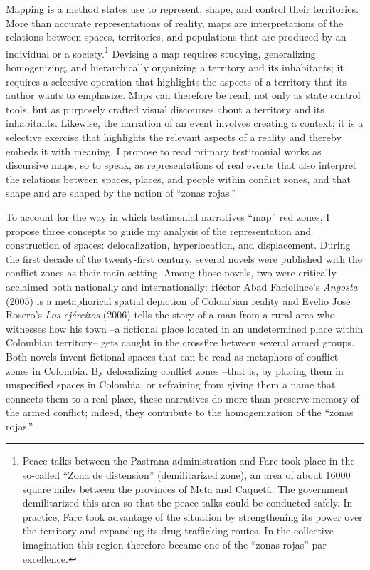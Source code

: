 \documentclass[
  11pt,
,
onecolumn,
openany
]{book}
\begin{document}
Mapping is a method states use to represent, shape, and control their
territories. More than accurate representations of reality, maps are
interpretations of the relations between spaces, territories, and populations
that are produced by an individual or a society.\footnote{Peace talks between
  the Pastrana administration and Farc took place in the so-called ``Zona de
  distension'' (demilitarized zone), an area of about 16000 square miles
  between the provinces of Meta and Caquetá. The government demilitarized this
  area so that the peace talks could be conducted safely. In practice, Farc
  took advantage of the situation by strengthening its power over the
  territory and expanding its drug trafficking routes. In the collective
  imagination this region therefore became one of the ``zonas rojas'' par
  excellence.} Devising a map requires studying, generalizing, homogenizing,
and hierarchically organizing a territory and its inhabitants; it requires a
selective operation that highlights the aspects of a territory that its author
wants to emphasize. Maps can therefore be read, not only as state control
tools, but as purposely crafted visual discourses about a territory and its
inhabitants. Likewise, the narration of an event involves creating a context;
it is a selective exercise that highlights the relevant aspects of a reality
and thereby embeds it with meaning. I propose to read primary testimonial
works as discursive maps, so to speak, as representations of real events that
also interpret the relations between spaces, places, and people within
conflict zones, and that shape and are shaped by the notion of ``zonas
rojas.''

To account for the way in which testimonial narratives ``map'' red zones, I
propose three concepts to guide my analysis of the representation and
construction of spaces: delocalization, hyperlocation, and displacement.
During the first decade of the twenty-first century, several novels were
published with the conflict zones as their main setting. Among those novels,
two were critically acclaimed both nationally and internationally: Héctor Abad
Faciolince's \emph{Angosta} (2005) is a metaphorical spatial depiction of
Colombian reality and Evelio José Rosero's \emph{Los ejércitos} (2006) tells
the story of a man from a rural area who witnesses how his town --a fictional
place located in an undetermined place within Colombian territory-- gets
caught in the crossfire between several armed groups. Both novels invent
fictional spaces that can be read as metaphors of conflict zones in Colombia.
By delocalizing conflict zones --that is, by placing them in unspecified
spaces in Colombia, or refraining from giving them a name that connects them
to a real place, these narratives do more than preserve memory of the armed
conflict; indeed, they contribute to the homogenization of the ``zonas
rojas.''
\end{document}
